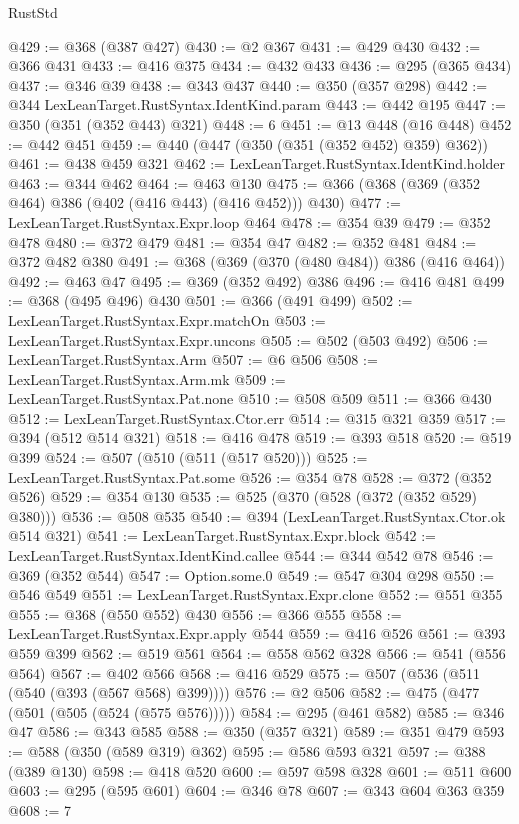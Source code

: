\begin{lexlean}{RustStd}
\begin{coremodule}
@429 := @368 (@387 @427)
@430 := @2 @367
@431 := @429 @430
@432 := @366 @431
@433 := @416 @375
@434 := @432 @433
@436 := @295 (@365 @434)
@437 := @346 @39
@438 := @343 @437
@440 := @350 (@357 @298)
@442 := @344 LexLeanTarget.RustSyntax.IdentKind.param
@443 := @442 @195
@447 := @350 (@351 (@352 @443) @321)
@448 := 6
@451 := @13 @448 (@16 @448)
@452 := @442 @451
@459 := @440 (@447 (@350 (@351 (@352 @452) @359) @362))
@461 := @438 @459 @321
@462 := LexLeanTarget.RustSyntax.IdentKind.holder
@463 := @344 @462
@464 := @463 @130
@475 := @366 (@368 (@369 (@352 @464) @386 (@402 (@416 @443) (@416 @452))) @430)
@477 := LexLeanTarget.RustSyntax.Expr.loop @464
@478 := @354 @39
@479 := @352 @478
@480 := @372 @479
@481 := @354 @47
@482 := @352 @481
@484 := @372 @482 @380
@491 := @368 (@369 (@370 (@480 @484)) @386 (@416 @464))
@492 := @463 @47
@495 := @369 (@352 @492) @386
@496 := @416 @481
@499 := @368 (@495 @496) @430
@501 := @366 (@491 @499)
@502 := LexLeanTarget.RustSyntax.Expr.matchOn
@503 := LexLeanTarget.RustSyntax.Expr.uncons
@505 := @502 (@503 @492)
@506 := LexLeanTarget.RustSyntax.Arm
@507 := @6 @506
@508 := LexLeanTarget.RustSyntax.Arm.mk
@509 := LexLeanTarget.RustSyntax.Pat.none
@510 := @508 @509
@511 := @366 @430
@512 := LexLeanTarget.RustSyntax.Ctor.err
@514 := @315 @321 @359
@517 := @394 (@512 @514 @321)
@518 := @416 @478
@519 := @393 @518
@520 := @519 @399
@524 := @507 (@510 (@511 (@517 @520)))
@525 := LexLeanTarget.RustSyntax.Pat.some
@526 := @354 @78
@528 := @372 (@352 @526)
@529 := @354 @130
@535 := @525 (@370 (@528 (@372 (@352 @529) @380)))
@536 := @508 @535
@540 := @394 (LexLeanTarget.RustSyntax.Ctor.ok @514 @321)
@541 := LexLeanTarget.RustSyntax.Expr.block
@542 := LexLeanTarget.RustSyntax.IdentKind.callee
@544 := @344 @542 @78
@546 := @369 (@352 @544)
@547 := Option.some.{0}
@549 := @547 @304 @298
@550 := @546 @549
@551 := LexLeanTarget.RustSyntax.Expr.clone
@552 := @551 @355
@555 := @368 (@550 @552) @430
@556 := @366 @555
@558 := LexLeanTarget.RustSyntax.Expr.apply @544
@559 := @416 @526
@561 := @393 @559 @399
@562 := @519 @561
@564 := @558 @562 @328
@566 := @541 (@556 @564)
@567 := @402 @566
@568 := @416 @529
@575 := @507 (@536 (@511 (@540 (@393 (@567 @568) @399))))
@576 := @2 @506
@582 := @475 (@477 (@501 (@505 (@524 (@575 @576)))))
@584 := @295 (@461 @582)
@585 := @346 @47
@586 := @343 @585
@588 := @350 (@357 @321)
@589 := @351 @479
@593 := @588 (@350 (@589 @319) @362)
@595 := @586 @593 @321
@597 := @388 (@389 @130)
@598 := @418 @520
@600 := @597 @598 @328
@601 := @511 @600
@603 := @295 (@595 @601)
@604 := @346 @78
@607 := @343 @604 @363 @359
@608 := 7

\end{coremodule}
\end{lexlean}
